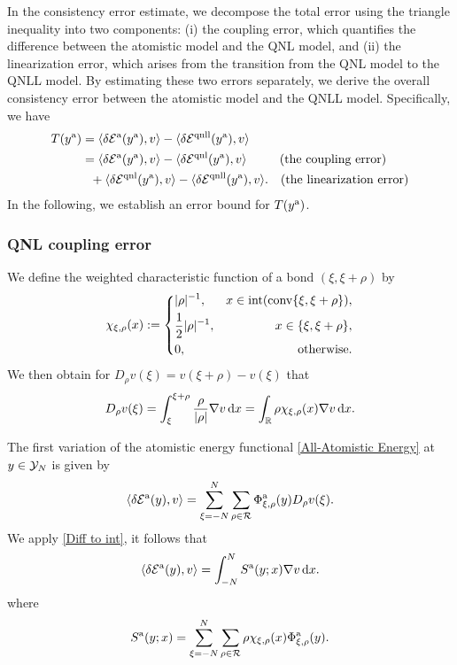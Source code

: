 In the consistency error estimate, we decompose the total error using the triangle inequality into two components: (i) the coupling error, which quantifies the difference between the atomistic model and the QNL model, and (ii) the linearization error, which arises from the transition from the QNL model to the QNLL model. By estimating these two errors separately, we derive the overall consistency error between the atomistic model and the QNLL model. Specifically, we have
\begin{align*}
	T(y^{{\rm a}}) &= \langle \delta \mathcal{E}^{{\rm a}} (y^{{\rm a}}),v\rangle -\langle \delta \mathcal{E}^{{\rm qnll}} (y^{{\rm a}}),v\rangle\\
	&=\langle \delta \mathcal{E}^{{\rm a}} (y^{{\rm a}}),v\rangle -\langle \delta \mathcal{E}^{{\rm qnl}} (y^{{\rm a}}),v\rangle ~~\qquad \text{(the coupling error)}\\
	&\ \ +\langle \delta \mathcal{E}^{{\rm qnl}} (y^{{\rm a}}),v\rangle -\langle \delta \mathcal{E}^{{\rm qnll}} (y^{{\rm a}}),v\rangle. \quad \text{(the linearization error)}
\end{align*}
In the following, we establish an error bound for $T(y^{\rm a})$.

\subsubsection{QNL coupling error}

We define the weighted characteristic function of a bond $(\xi ,\xi +\rho)$ by
\begin{equation}\label{Definition of Ki}
	\chi_{\xi,\rho}(x):=\left\{
	\begin{aligned}
		&\vert\rho\vert^{-1}, &x\in \text{int} ({\rm conv} \{\xi,\xi+\rho\}), \\
		&\frac{1}{2}\vert\rho\vert^{-1}, &x\in \{\xi,\xi+\rho\}, \\
		&0, &\text{otherwise}.
	\end{aligned}
	\right.
\end{equation}
We then obtain for $D_{\rho}v(\xi) = v(\xi+\rho) -v(\xi)$ that
\begin{equation}\label{Diff to int}
	D_{\rho}v(\xi)=\int_{\xi}^{\xi+\rho}\frac{\rho}{\vert\rho\vert}\nabla v\,\text{d} x
	=\int_{\mathbb{R}}\rho \chi_{\xi,\rho}(x)\nabla v\,\text{d} x.
\end{equation}

The first variation of the atomistic energy functional \eqref{All-Atomistic Energy} at $y \in \mathcal{Y}_{N}$ is given by
\begin{equation*}
	\langle \delta \mathcal{E}^{{\rm a}}(y), v\rangle = \sum_{\xi = -N}^{N} \sum_{\rho \in \mathcal{R}}\Phi^{{\rm a}}_{\xi,\rho}(y)D_{\rho}v(\xi).
\end{equation*}
We apply \eqref{Diff to int}, it follows that
\begin{equation}\label{Atomistic first variation}
	\langle \delta \mathcal{E}^{{\rm a}}(y), v\rangle = \int_{-N}^{N} S^{{\rm a}}(y;x) \nabla v\,\text{d} x.
\end{equation}
where
\begin{equation}\label{Atomistic stress tensor}
	S^{{\rm a}}(y;x) = \sum_{\xi=-N}^{N} \sum_{\rho \in \mathcal{R}} \rho \chi_{\xi,\rho}(x) \Phi^{{\rm a}}_{\xi,\rho}(y).
\end{equation}



